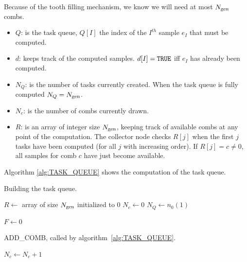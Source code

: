 \documentclass[./thesis.tex]{subfiles}
\begin{document}
Because of the tooth filling mechanism, we know we will need at most ${N_\text{gen}}$ combs.
\begin{itemize}
\item $Q$: is the task queue, $Q[I]$ the index of the $I^{th}$ sample $e_I$ that must be computed.
\item $d$: keeps track of the computed samples. $d[I] = {\text{\texttt{TRUE}}}$ iff $e_I$ has already been computed.
\item $N_Q$: is the number of tasks currently created. When the task queue is fully computed $N_Q = {N_\text{gen}}$.
\item $N_c$: is the number of combs currently drawn.
\item $R$: is an array of integer size ${N_\text{gen}}$, keeping track of available combs at any point of the computation. The collector node checks $R[j]$ when the first $j$ tasks have been computed (for all $j$ with increasing order). If $R[j] = c \neq 0$, all samples for comb $c$ have just become available. 
\end{itemize}
Algorithm \ref{alg:TASK_QUEUE} shows the computation of the task queue.


\begin{algorithm}
	\caption{Building the task queue.}
	\label{alg:TASK_QUEUE}
	$R \gets $ array of size ${N_\text{gen}}$ initialized to $0$ \;
	$N_c \gets 0$ \;
	$N_Q \gets n_0(1)$ \;
	
	
	\For{$i \gets 1,\Ngen$}{
		$u[i] \gets $ random value in $[0,1)_\mathbb{R}$ \;	
	}
	$F \gets 0$ \;	
\end{algorithm}

\begin{algorithm}
	\caption{ADD\_COMB, called by algorithm~\ref{alg:TASK_QUEUE}.}
	\label{alg:ADD_COMB}
		$N_c \gets N_c + 1$ \;
\end{algorithm}
\end{document}
